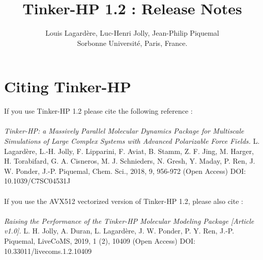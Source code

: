 \documentclass[]{article}
\title{Tinker-HP 1.2 : Release Notes}
\author{Louis Lagardère, Luc-Henri Jolly, Jean-Philip Piquemal \\
Sorbonne Université, Paris, France.\\
}
\begin{document}
\maketitle
\newpage
\section{Citing Tinker-HP}

If you use Tinker-HP 1.2 please cite the following reference : 
\\
\\
{\em Tinker-HP: a Massively Parallel Molecular Dynamics Package for Multiscale Simulations of Large Complex Systems with Advanced Polarizable Force Fields.}
L. Lagardère, L.-H. Jolly, F. Lipparini, F. Aviat, B. Stamm, Z. F. Jing, M. Harger, H. Torabifard, G. A. Cisneros, M. J. Schnieders, N. Gresh, Y. Maday, P. Ren, J. W. Ponder, J.-P. Piquemal, Chem. Sci., 2018, 9, 956-972 (Open Access)
DOI: 10.1039/C7SC04531J
\\
\\
If you use the AVX512 vectorized version of Tinker-HP 1.2, please also cite :
\\
\\
{\em Raising the Performance of the Tinker-HP Molecular Modeling Package [Article v1.0].}
L. H. Jolly, A. Duran, L. Lagardère, J. W. Ponder, P. Y. Ren, J.-P. Piquemal, LiveCoMS, 2019, 1 (2), 10409  (Open Access) DOI: 10.33011/livecoms.1.2.10409
\end{document}
